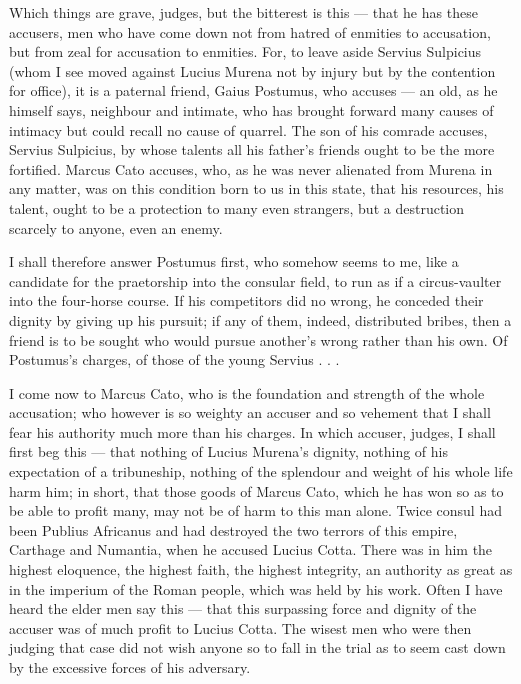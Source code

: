  Which things are grave, judges, but the bitterest is this --- that he has these accusers, men who have come down not from hatred of enmities to accusation, but from zeal for accusation to enmities. For, to leave aside Servius Sulpicius (whom I see moved against Lucius Murena not by injury but by the contention for office), it is a paternal friend, Gaius Postumus, who accuses --- an old, as he himself says, neighbour and intimate, who has brought forward many causes of intimacy but could recall no cause of quarrel. The son of his comrade accuses, Servius Sulpicius, by whose talents all his father's friends ought to be the more fortified. Marcus Cato accuses, who, as he was never alienated from Murena in any matter, was on this condition born to us in this state, that his resources, his talent, ought to be a protection to many even strangers, but a destruction scarcely to anyone, even an enemy.

 I shall therefore answer Postumus first, who somehow seems to me, like a candidate for the praetorship into the consular field, to run as if a circus-vaulter into the four-horse course. If his competitors did no wrong, he conceded their dignity by giving up his pursuit; if any of them, indeed, distributed bribes, then a friend is to be sought who would pursue another's wrong rather than his own. Of Postumus's charges, of those of the young Servius . . .

 I come now to Marcus Cato, who is the foundation and strength of the whole accusation; who however is so weighty an accuser and so vehement that I shall fear his authority much more than his charges. In which accuser, judges, I shall first beg this --- that nothing of Lucius Murena's dignity, nothing of his expectation of a tribuneship, nothing of the splendour and weight of his whole life harm him; in short, that those goods of Marcus Cato, which he has won so as to be able to profit many, may not be of harm to this man alone. Twice consul had been Publius Africanus and had destroyed the two terrors of this empire, Carthage and Numantia, when he accused Lucius Cotta. There was in him the highest eloquence, the highest faith, the highest integrity, an authority as great as in the imperium of the Roman people, which was held by his work. Often I have heard the elder men say this --- that this surpassing force and dignity of the accuser was of much profit to Lucius Cotta. The wisest men who were then judging that case did not wish anyone so to fall in the trial as to seem cast down by the excessive forces of his adversary.

